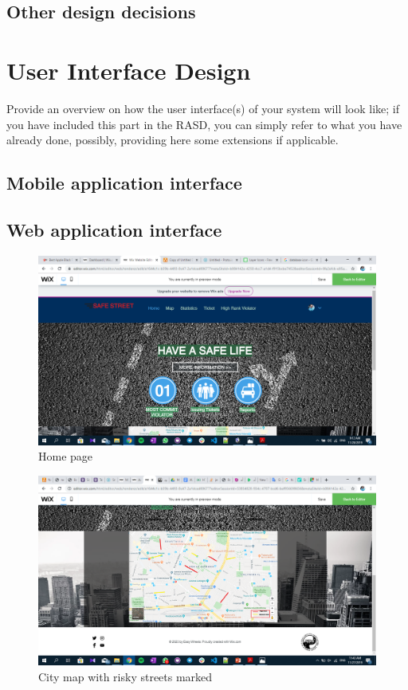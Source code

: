 \documentclass{article}
\begin{document}
	\subsection{Other design decisions}
\section{User Interface Design}Provide	an	overview	on	how	the	user	interface(s)	of	your	system	will	
look	like; if	you	 have	included	 this	 part	in	 the	 RASD,	you	 can	 simply	 refer	 to	what	you	 have	
already	done,	possibly,	providing	here	some	extensions	if	applicable.
	\subsection{Mobile application interface}
	\subsection{Web application interface}
		\label{fig:homepage}
		\begin{figure}[H]
			\includegraphics[width=\linewidth]{images/home.png}
			\caption{Home page}
		\end{figure}
		\begin{figure}[H]
			\includegraphics[width=\linewidth]{images/map.png}
			\caption{City map with risky streets marked}
		\end{figure}
\end{document}

